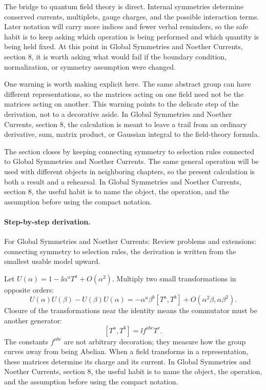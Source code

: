 The bridge to quantum field theory is direct.  Internal symmetries determine conserved currents, multiplets, gauge charges, and the possible interaction terms.  Later notation will carry more indices and fewer verbal reminders, so the safe habit is to keep asking which operation is being performed and which quantity is being held fixed.  At this point in Global Symmetries and Noether Currents, section 8, it is worth asking what would fail if the boundary condition, normalization, or symmetry assumption were changed.

One warning is worth making explicit here.  The same abstract group can have different representations, so the matrices acting on one field need not be the matrices acting on another.  This warning points to the delicate step of the derivation, not to a decorative aside.  In Global Symmetries and Noether Currents, section 8, the calculation is meant to leave a trail from an ordinary derivative, sum, matrix product, or Gaussian integral to the field-theory formula.

The section closes by keeping connecting symmetry to selection rules connected to Global Symmetries and Noether Currents.  The same general operation will be used with different objects in neighboring chapters, so the present calculation is both a result and a rehearsal.  In Global Symmetries and Noether Currents, section 8, the useful habit is to name the object, the operation, and the assumption before using the compact notation.



\paragraph{Step-by-step derivation.}

For Global Symmetries and Noether Currents: Review problems and extensions: connecting symmetry to selection rules, the derivation is written from the smallest usable model upward.

Let \(U(\alpha)=1-\ii\alpha^aT^a+O(\alpha^2)\).  Multiply two small transformations in opposite orders:
\[
  U(\alpha)U(\beta)-U(\beta)U(\alpha)
  =
  -\alpha^a\beta^b[T^a,T^b]+O(\alpha^2\beta,\alpha\beta^2).
\]
Closure of the transformations near the identity means the commutator must be another generator:
\[
  [T^a,T^b]=\ii f^{abc}T^c.
\]
The constants \(f^{abc}\) are not arbitrary decoration; they measure how the group curves away from being Abelian.  When a field transforms in a representation, these matrices determine its charge and its current.  In Global Symmetries and Noether Currents, section 8, the useful habit is to name the object, the operation, and the assumption before using the compact notation.

